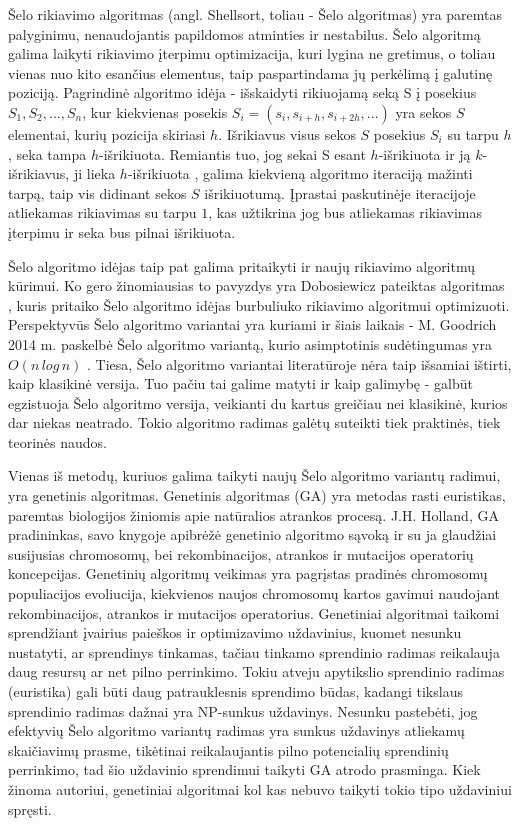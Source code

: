 \documentclass{VUMIFInfKursinis}
\begin{document}
Šelo rikiavimo algoritmas (angl. Shellsort, toliau - Šelo algoritmas) \cite{10.1145/368370.368387} yra paremtas palyginimu, nenaudojantis papildomos atminties ir nestabilus.
Šelo algoritmą galima laikyti rikiavimo įterpimu optimizacija,
kuri lygina ne gretimus, o toliau vienas nuo kito esančius elementus, taip paspartindama jų perkėlimą į galutinę poziciją.
Pagrindinė algoritmo idėja - išskaidyti rikiuojamą seką S į posekius $S_1, S_2, ..., S_n$,
kur kiekvienas posekis $S_i = (s_i, s_{i+h}, s_{i+2h}, ...)$ yra sekos $S$ elementai, kurių pozicija skiriasi $h$.
Išrikiavus visus sekos $S$ posekius $S_i$ su tarpu $h$, seka tampa $h$-išrikiuota.
Remiantis tuo, jog sekai S esant $h$-išrikiuota ir ją $k$-išrikiavus, ji lieka $h$-išrikiuota \cite{GALE1972103},
galima kiekvieną algoritmo iteraciją mažinti tarpą, taip vis didinant sekos $S$ išrikiuotumą.
Įprastai paskutinėje iteracijoje atliekamas rikiavimas su tarpu $1$, kas užtikrina jog bus atliekamas
rikiavimas įterpimu ir seka bus pilnai išrikiuota.

Šelo algoritmo idėjas taip pat galima pritaikyti ir naujų rikiavimo algoritmų kūrimui.
Ko gero žinomiausias to pavyzdys yra Dobosiewicz pateiktas algoritmas \cite{dobosiewicz1980efficient},
kuris pritaiko Šelo algoritmo idėjas burbuliuko rikiavimo algoritmui optimizuoti.
Perspektyvūs Šelo algoritmo variantai yra kuriami ir šiais laikais -
M. Goodrich 2014 m. paskelbė Šelo algoritmo variantą, kurio asimptotinis sudėtingumas yra $O(n\,log\,n)$ \cite{goodrich2014zig}.
Tiesa, Šelo algoritmo variantai literatūroje nėra taip išsamiai ištirti, kaip klasikinė versija.
Tuo pačiu tai galime matyti ir kaip galimybę - galbūt egzistuoja Šelo algoritmo versija, veikianti du kartus greičiau nei
klasikinė, kurios dar niekas neatrado.
Tokio algoritmo radimas galėtų suteikti tiek praktinės, tiek teorinės naudos.

Vienas iš metodų, kuriuos galima taikyti naujų Šelo algoritmo variantų radimui, yra genetinis algoritmas.
Genetinis algoritmas (GA) yra metodas rasti euristikas, paremtas biologijos žiniomis apie natūralios atrankos procesą.
J.H. Holland, GA pradininkas, savo knygoje \cite{holland1992adaptation}
apibrėžė genetinio algoritmo sąvoką ir su ja glaudžiai susijusias
chromosomų, bei rekombinacijos, atrankos ir mutacijos operatorių koncepcijas.
Genetinių algoritmų veikimas yra pagrįstas pradinės chromosomų populiacijos evoliucija, kiekvienos naujos chromosomų kartos
gavimui naudojant rekombinacijos, atrankos ir mutacijos operatorius.
Genetiniai algoritmai taikomi sprendžiant įvairius paieškos ir optimizavimo uždavinius, kuomet nesunku nustatyti, ar sprendinys tinkamas,
tačiau tinkamo sprendinio radimas reikalauja daug resursų ar net pilno perrinkimo.
Tokiu atveju apytikslio sprendinio radimas (euristika) gali būti daug patrauklesnis sprendimo būdas,
kadangi tikslaus sprendinio radimas dažnai yra NP-sunkus uždavinys.
Nesunku pastebėti, jog efektyvių Šelo algoritmo variantų radimas yra sunkus uždavinys atliekamų skaičiavimų prasme,
tikėtinai reikalaujantis pilno potencialių sprendinių perrinkimo, tad šio uždavinio sprendimui taikyti GA atrodo prasminga.
Kiek žinoma autoriui, genetiniai algoritmai kol kas nebuvo taikyti tokio tipo uždaviniui spręsti.
\end{document}

